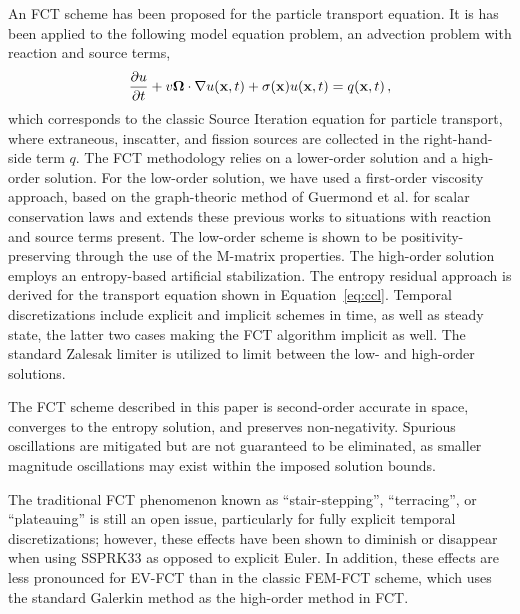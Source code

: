 An FCT scheme has been proposed for the particle transport equation. It is has been applied
to the following model equation problem, an advection problem with reaction and source terms,
\begin{equation} \label{eq:ccl}
  \frac{\partial u}{\partial t} + v\mathbf{\Omega}\cdot\nabla u(\mathbf{x},t) + \sigma(\mathbf{x}) u(\mathbf{x},t) = q(\mathbf{x},t) \,,
\end{equation}
which corresponds to the classic Source Iteration equation for particle transport,
where extraneous, inscatter, and fission sources are collected in the right-hand-side term $q$.
%
The FCT methodology relies on a lower-order solution and a high-order solution. For the low-order
solution, we have used a first-order viscosity approach, based on the graph-theoric method of
Guermond et al. \cite{guermond_firstorder} for scalar conservation laws and extends these
previous works to situations with reaction and source terms present. The low-order scheme is shown
to be positivity-preserving through the use of the M-matrix properties. The high-order solution
employs an entropy-based artificial stabilization. The entropy residual approach is derived
for the transport equation shown in Equation~\eqref{eq:ccl}.
Temporal discretizations include explicit and implicit schemes in time, as well as steady state,
the latter two cases making the FCT algorithm implicit as well. The standard Zalesak limiter is utilized
to limit between the low- and high-order solutions.

The FCT scheme described in this paper is second-order accurate in space,
converges to the entropy solution, and preserves non-negativity.
Spurious oscillations are mitigated but are not guaranteed to be
eliminated, as smaller magnitude oscillations may exist within the imposed
solution bounds.


The traditional FCT phenomenon known as ``stair-stepping'',
``terracing'', or ``plateauing'' is still an open issue, particularly for
fully explicit temporal discretizations; however, these effects
have been shown to diminish or disappear when using SSPRK33 as opposed
to explicit Euler. In addition, these effects are less pronounced for EV-FCT
than in the classic FEM-FCT scheme, which uses the standard Galerkin method as
the high-order method in FCT.

